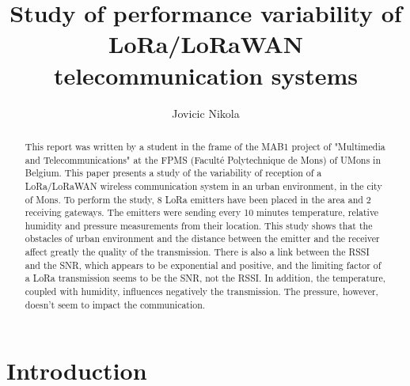 \documentclass[letterpaper, 10 pt, conference]{ieeeconf}  %
\title{\LARGE \bf
Study of performance variability of LoRa/LoRaWAN telecommunication systems
}
\author{Jovicic Nikola}%
\begin{document}
\maketitle
\thispagestyle{plain}
\pagestyle{plain} %


\begin{abstract}


This report was written by a student in the frame of the MAB1 project of "Multimedia and Telecommunications" at the FPMS (Facult\'e Polytechnique de Mons) of UMons in Belgium. This paper presents a study of the variability of reception of a LoRa/LoRaWAN wireless communication system in an urban environment, in the city of Mons. To perform the study, 8 LoRa emitters have been placed in the area and 2 receiving gateways. The emitters were sending every 10 minutes temperature, relative humidity and pressure measurements from their location. This study shows that the obstacles of urban environment and the distance between the emitter and the receiver affect greatly the quality of the transmission. There is also a link between the RSSI and the SNR, which appears to be exponential and positive, and the limiting factor of a LoRa transmission seems to be the SNR, not the RSSI. In addition, the temperature, coupled with humidity, influences negatively the transmission. The pressure, however, doesn't seem to impact the communication.

\end{abstract}

\section{Introduction}
\end{document}
